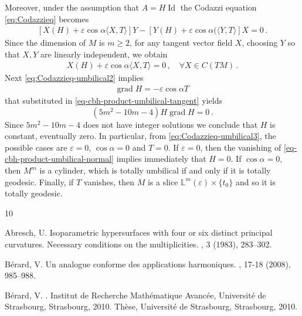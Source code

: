\documentclass[11pt,leqno]{amsart}
\theoremstyle{plain}
\theoremstyle{definition}
\numberwithin{equation}{section}
\newcommand{\Id}{\operatorname{Id}}
\DeclareMathOperator{\grad}{grad}
\numberwithin{equation}{section}
\begin{document}
{Moreover, under the assumption that $A=H \Id$ the Codazzi equation \eqref{eq:Codazzieq} becomes
\begin{eqnarray}
\label{eq:Codazzieq-umbilical} 
[X(H)+\varepsilon\cos\alpha \langle X,T\rangle] Y-[Y(H) +\varepsilon\cos\alpha(\langle Y,T\rangle]X=0\,.
\end{eqnarray}
Since the dimension of $M$ is $m\geq 2$, for any tangent vector field $X$, choosing $Y$ so that $X,Y$ are linearly independent, we obtain
 \begin{eqnarray}
\label{eq:Codazzieq-umbilical2} 
X(H)+\varepsilon\cos\alpha \langle X,T\rangle =0\,,\quad \forall X\in C(TM)\,.
\end{eqnarray}
Next \eqref{eq:Codazzieq-umbilical2} implies 
 \begin{eqnarray}
\label{eq:Codazzieq-umbilical3} 
\grad H= -\varepsilon\cos\alpha T \,
\end{eqnarray}
that substituted in \eqref{eq-cbh-product-umbilical-tangent} yields 
$$
(5m^2-10m-4) H \grad H=0\,.
$$
Since $5m^2-10m-4$ does not have integer solutions we conclude that $H$ is constant, eventually zero. In particular, from \eqref{eq:Codazzieq-umbilical3}, the possible cases are $\varepsilon=0$, $\cos\alpha=0$ and $T=0$. If $\varepsilon=0$, then the vanishing of  \eqref{eq-cbh-product-umbilical-normal} implies immediately that $H=0$. If $\cos\alpha=0$, then $M^m$ is a cylinder, which is totally umbilical if and only if it is totally geodesic. Finally, if $T$ vanishes, then $M$ is a slice ${\mathbb L}^m(\varepsilon)\times \{t_0\}$ and so it is totally geodesic. \\

%
%
%
 
\begin{thebibliography}{10}

{\sc Abresch, U.}
\newblock Isoparametric hypersurfaces with four or six distinct principal
  curvatures. {N}ecessary conditions on the multiplicities.
, 3 (1983), 283--302.

{\sc B\'erard, V.}
\newblock Un analogue conforme des applications harmoniques.
, 17-18 (2008), 985--988.

{\sc B\'erard, V.}
.
\newblock Institut de Recherche Math\'ematique Avanc\'ee, Universit\'e{} de
  Strasbourg, Strasbourg, 2010.
\newblock Th\`ese, Universit\'e{} de Strasbourg, Strasbourg, 2010.


\end{thebibliography}}
\end{document}
